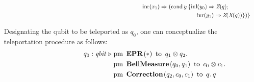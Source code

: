 \begin{align*}
      & \hspace{240pt}\text{inr} (x_{1})  \Rightarrow  (\text{cond}\hspace{2pt} y  \hspace{2pt}  \{\text{inl} (y_{0})  \Rightarrow   \textit{Z}(q);  \\
      \hspace{-28pt}
      &\hspace{335pt} \text{inr} (y_{1}) \Rightarrow{} \textit{Z} (\textit{X}(q)) \})\}
 \end{align*}


 Designating the qubit to be teleported as $q_0$, one can conceptualize the teleportation procedure as follows:
 \begin{align*}
    \hspace{80 pt} q_{0}: \textit{qbit}\hspace{3 pt} \triangleright \hspace{3 pt} & \text{pm} \hspace{5pt} \textbf{EPR}\hspace{1pt} (*) \hspace{5pt} \text{to} \hspace{5pt}  q_{1} \otimes q_{2}.  \notag \\
     & \text{pm}\hspace{5pt} \textbf{BellMeasure} \hspace{1pt} (q_0,q_{1}) \hspace{5pt}  \text{to} \hspace{5pt} c_{0}\otimes c_{1} . \notag \\
     & \text{pm} \hspace{5pt}  \textbf{Correction} \hspace{1pt} ( q_{2},  c_{0}, c_{1} ) \hspace{5pt} \text{to} \hspace{5pt}  q. \hspace{2pt}  q
 \end{align*}
 

